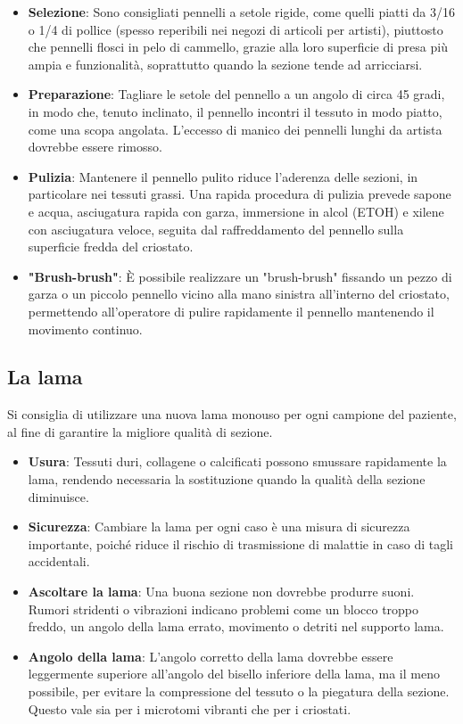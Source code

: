 \begin{itemize}
    \item \textbf{Selezione}: Sono consigliati pennelli a setole rigide, come quelli piatti da 3/16 o 1/4 di pollice (spesso reperibili nei negozi di articoli per artisti), piuttosto che pennelli flosci in pelo di cammello, grazie alla loro superficie di presa più ampia e funzionalità, soprattutto quando la sezione tende ad arricciarsi.
    \item \textbf{Preparazione}: Tagliare le setole del pennello a un angolo di circa 45 gradi, in modo che, tenuto inclinato, il pennello incontri il tessuto in modo piatto, come una scopa angolata. L'eccesso di manico dei pennelli lunghi da artista dovrebbe essere rimosso.
    \item \textbf{Pulizia}: Mantenere il pennello pulito riduce l'aderenza delle sezioni, in particolare nei tessuti grassi. Una rapida procedura di pulizia prevede sapone e acqua, asciugatura rapida con garza, immersione in alcol (ETOH) e xilene con asciugatura veloce, seguita dal raffreddamento del pennello sulla superficie fredda del criostato.
    \item \textbf{"Brush-brush"}: È possibile realizzare un "brush-brush" fissando un pezzo di garza o un piccolo pennello vicino alla mano sinistra all'interno del criostato, permettendo all'operatore di pulire rapidamente il pennello mantenendo il movimento continuo.
\end{itemize}

\subsection{La lama}
Si consiglia di utilizzare una nuova lama monouso per ogni campione del paziente, al fine di garantire la migliore qualità di sezione.
\begin{itemize}
    \item \textbf{Usura}: Tessuti duri, collagene o calcificati possono smussare rapidamente la lama, rendendo necessaria la sostituzione quando la qualità della sezione diminuisce.
    \item \textbf{Sicurezza}: Cambiare la lama per ogni caso è una misura di sicurezza importante, poiché riduce il rischio di trasmissione di malattie in caso di tagli accidentali.
    \item \textbf{Ascoltare la lama}: Una buona sezione non dovrebbe produrre suoni. Rumori stridenti o vibrazioni indicano problemi come un blocco troppo freddo, un angolo della lama errato, movimento o detriti nel supporto lama.
    \item \textbf{Angolo della lama}: L'angolo corretto della lama dovrebbe essere leggermente superiore all'angolo del bisello inferiore della lama, ma il meno possibile, per evitare la compressione del tessuto o la piegatura della sezione. Questo vale sia per i microtomi vibranti che per i criostati.
\end{itemize}

